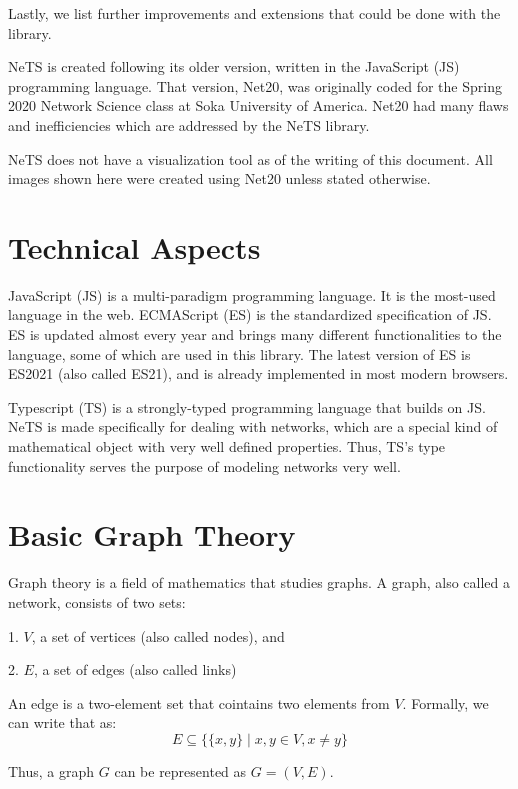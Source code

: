 Lastly, we list further improvements and extensions that could be done with the library.

NeTS is created following its older version, written in the JavaScript (JS) programming language.
That version, Net20, was originally coded for the Spring 2020 Network Science class
at Soka University of America.
Net20 had many flaws and inefficiencies which are addressed by the NeTS library.

NeTS does not have a visualization tool as of the writing of this document.
All images shown here were created using Net20 unless stated otherwise.

\section{Technical Aspects}

JavaScript (JS) is a multi-paradigm programming language.
It is the most-used language in the web.
ECMAScript (ES) is the standardized specification of JS.
ES is updated almost every year and brings many different functionalities to the language, some of which are used in this library.
The latest version of ES is ES2021 (also called ES21),
and is already implemented in most modern browsers.

Typescript (TS) is a strongly-typed programming language that builds on JS.
NeTS is made specifically for dealing with networks,
which are a special kind of mathematical object with very well defined properties.
Thus, TS's type functionality serves the purpose of modeling networks very well.

\section{Basic Graph Theory}

Graph theory is a field of mathematics that studies graphs.
A graph, also called a network, consists of two sets:

1. $V$, a set of vertices (also called nodes), and

2. $E$, a set of edges (also called links)

An edge is a two-element set that cointains two elements from $V$.
Formally, we can write that as:
$$E\subseteq \{\{x,y\}\mid x,y\in V, x\ne y\}$$

Thus, a graph $G$ can be represented as $G=(V,E)$.


